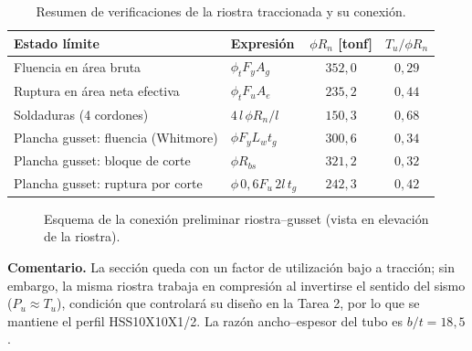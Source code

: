 \documentclass[11pt,letterpaper]{article}
\begin{document}
\begin{table}[H]
\centering
\caption{Resumen de verificaciones de la riostra traccionada y su conexión.}
\begin{tabular}{llcc}
\toprule
Estado límite & Expresión & $\phi R_n$ [tonf] & $T_u/\phi R_n$ \\
\midrule
Fluencia en área bruta & $\phi_t F_y A_g$ & $352{,}0$ & $0{,}29$ \\
Ruptura en área neta efectiva & $\phi_t F_u A_e$ & $235{,}2$ & $0{,}44$ \\
Soldaduras (4 cordones) & $4\,l\,\phi R_n/l$ & $150{,}3$ & $0{,}68$ \\
Plancha gusset: fluencia (Whitmore) & $\phi F_y L_w t_g$ & $300{,}6$ & $0{,}34$ \\
Plancha gusset: bloque de corte & $\phi R_{bs}$ & $321{,}2$ & $0{,}32$ \\
Plancha gusset: ruptura por corte & $\phi\,0{,}6F_u\,2l\,t_g$ & $242{,}3$ & $0{,}42$ \\
\bottomrule
\end{tabular}
\end{table}

\begin{figure}[H]
\centering
{}
\caption{Esquema de la conexión preliminar riostra--gusset (vista en elevación de la riostra).}
\label{fig:conexion}
\end{figure}

\textbf{Comentario.} La sección queda con un factor de utilización bajo a tracción; sin embargo, la misma riostra
trabaja en compresión al invertirse el sentido del sismo ($P_u \approx T_u$), condición que controlará su diseño
en la Tarea 2, por lo que se mantiene el perfil HSS10X10X1/2. La razón ancho--espesor del tubo es
$b/t = 18{,}5$.
\end{document}

